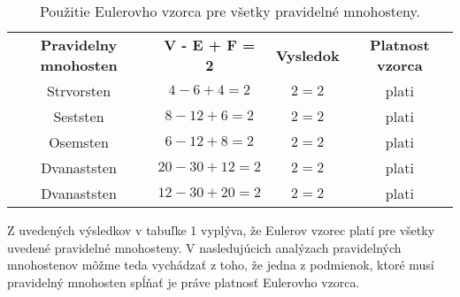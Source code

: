 	\begin{table}[h]
	\centering
	\caption{Použitie Eulerovho vzorca pre všetky pravidelné mnohosteny.}
	\label{tab 1}
	\begin{tabular}{|c|c|c|c|}
		\hline
		\multirow{2}{2.5cm}{\centering \textbf{Pravidelny mnohosten}}&\multirow{2}{3cm}{\centering \textbf{V - E + F = 2}}&\multirow{2}{2cm}{\centering \textbf{Vysledok}}&\multirow{2}{2cm}{\centering \textbf{Platnost vzorca}}\\ 
		&&& \\ \hline
		Strvorsten&$4 - 6 + 4 = 2$&$2 = 2$&{\color{green}plati} \\ \hline
		Seststen&$8 - 12 + 6 = 2$&$2 = 2$&{\color{green}plati} \\ \hline
		Osemsten&$6 - 12 + 8 = 2$&$2 = 2$&{\color{green}plati} \\ \hline
		Dvanaststen&$20 - 30 + 12 = 2$&$2 = 2$&{\color{green}plati} \\ \hline
		Dvanaststen&$12 - 30 + 20 = 2$&$2 = 2$&{\color{green}plati} \\ \hline
	\end{tabular}
\end{table}
\noindent
Z uvedených výsledkov v tabuľke 1 vyplýva, že Eulerov vzorec platí pre všetky uvedené pravidelné mnohosteny. V nasledujúcich analýzach pravidelných mnohostenov môžme teda vychádzať z toho, že jedna z podmienok, ktoré musí pravidelný mnohosten spĺňať je práve platnosť Eulerovho vzorca.